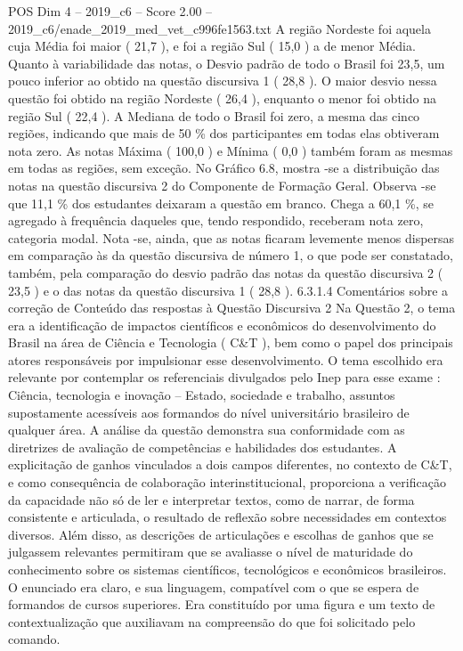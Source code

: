 \begin{textsample}{POS Dim 4 – 2019\_c6 – Score 2.00 – 2019\_c6/enade\_2019\_med\_vet\_c996fe1563.txt}
A região Nordeste foi aquela cuja Média foi maior ( 21,7 ), e foi a região Sul ( 15,0 ) a de menor Média.
Quanto à variabilidade das notas, o Desvio padrão de todo o Brasil foi 23,5, um pouco inferior ao obtido na questão discursiva 1 ( 28,8 ).
O maior desvio nessa questão foi obtido na região Nordeste ( 26,4 ), enquanto o menor foi obtido na região Sul ( 22,4 ).
A Mediana de todo o Brasil foi zero, a mesma das cinco regiões, indicando que mais de 50 \% dos participantes em todas elas obtiveram nota zero.
As notas Máxima ( 100,0 ) e Mínima ( 0,0 ) também foram as mesmas em todas as regiões, sem exceção.
No Gráfico 6.8, mostra -se a distribuição das notas na questão discursiva 2 do Componente de Formação Geral.
Observa -se que 11,1 \% dos estudantes deixaram a questão em branco.
Chega a 60,1 \%, se agregado à frequência daqueles que, tendo respondido, receberam nota zero, categoria modal.
Nota -se, ainda, que as notas ficaram levemente menos dispersas em comparação às da questão discursiva de número 1, o que pode ser constatado, também, pela comparação do desvio padrão das notas da questão discursiva 2 ( 23,5 ) e o das notas da questão discursiva 1 ( 28,8 ). 6.3.1.4 Comentários sobre a correção de Conteúdo das respostas à Questão Discursiva 2 Na Questão 2, o tema era a identificação de impactos científicos e econômicos do desenvolvimento do Brasil na área de Ciência e Tecnologia ( C\&T ), bem como o papel dos principais atores responsáveis por impulsionar esse desenvolvimento.
O tema escolhido era relevante por contemplar os referenciais divulgados pelo Inep para esse exame : Ciência, tecnologia e inovação – Estado, sociedade e trabalho, assuntos supostamente acessíveis aos formandos do nível universitário brasileiro de qualquer área.
A análise da questão demonstra sua conformidade com as diretrizes de avaliação de competências e habilidades dos estudantes.
A explicitação de ganhos vinculados a dois campos diferentes, no contexto de C\&T, e como consequência de colaboração interinstitucional, proporciona a verificação da capacidade não só de ler e interpretar textos, como de narrar, de forma consistente e articulada, o resultado de reflexão sobre necessidades em contextos diversos.
Além disso, as descrições de articulações e escolhas de ganhos que se julgassem relevantes permitiram que se avaliasse o nível de maturidade do conhecimento sobre os sistemas científicos, tecnológicos e econômicos brasileiros.
O enunciado era claro, e sua linguagem, compatível com o que se espera de formandos de cursos superiores.
Era constituído por uma figura e um texto de contextualização que auxiliavam na compreensão do que foi solicitado pelo comando.

\end{textsample}
